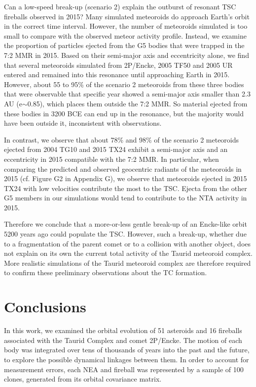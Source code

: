 \documentclass[letters,a4paper,fleqn,usenatbib]{mnras}
\begin{document}
Can a low-speed break-up (scenario 2) explain the outburst of resonant TSC fireballs observed in 2015? Many simulated meteoroids do approach Earth's orbit in the correct time interval. However, the number of meteoroids simulated is too small to compare with the observed meteor activity profile. Instead,  we examine the proportion of particles ejected from the G5 bodies that were trapped in the 7:2 MMR in 2015. Based on their semi-major axis and eccentricity alone, we find that several meteoroids simulated from 2P/Encke, 2005 TF50 and 2005 UR entered and remained into this resonance until approaching Earth in 2015. However, about 55 to 95\% of the scenario 2 meteoroids from these three bodies that were observable that specific year showed a semi-major axis smaller than 2.3 AU (e$\sim$0.85), which places them outside the 7:2 MMR. So material ejected from these bodies in 3200 BCE can end up in the resonance, but the majority would have been outside it, inconsistent with observations.

In contrast, we observe that about 78\% and 98\% of the scenario 2 meteoroids ejected from 2004 TG10 and 2015 TX24 exhibit a semi-major axis and an eccentricity in 2015 compatible with the 7:2 MMR. In particular, when comparing the predicted and observed geocentric radiants of the meteoroids in 2015 (cf. Figure G2 in Appendix G), we observe that meteoroids ejected in 2015 TX24 with low velocities contribute the most to the TSC. Ejecta from the other G5 members in our simulations would tend to contribute to the NTA activity in 2015. 

Therefore we conclude that a more-or-less gentle break-up of an Encke-like orbit 5200 years ago could populate the TSC. However, such a break-up, whether due to a fragmentation of the parent comet or to a collision with another object, does not explain on its own the current total activity of the Taurid meteoroid complex. More realistic simulations of the Taurid meteoroid complex are therefore required to confirm these preliminary observations about the TC formation.

 \section{Conclusions}
 
 In this work, we examined the orbital evolution of 51 asteroids and 16 fireballs associated with the Taurid Complex and comet 2P/Encke. The motion of each body was integrated over tens of thousands of years into the past and the future, to explore the possible dynamical linkages between them. In order to account for measurement errors, each NEA and fireball was represented by a sample of 100 clones, generated from its orbital covariance matrix. 
 
\end{document}
